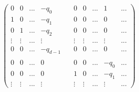 \documentclass[a4paper,11pt]{article}
\begin{document}
\[ 
\left( \begin{array}{cccccccccc}
0 & 0 & ... & -q_0 &             \ & 0 & 0 & ... & 1 & ... \\
1 & 0 & ... & -q_1 &             \ & 0 & 0 & ... & 0 & ...\\
0 & 1 & ... & -q_2 &             \ & 0 & 0 & ... & 0 & ...\\
\vdots & \vdots & ... & \vdots & \ & \vdots & \vdots & ... & \vdots & ...\\
0 & 0 & ... & -q_{d-1} &         \ & 0 & 0 & ... & 0 & ... \\ 
\\
0 & 0 & ... & 0   &              \ & 0 & 0 & ... & -q_{0} & ... \\
0 & 0 & ... & 0   &              \ & 1 & 0 & ... & -q_{1} & ... \\
\vdots & \vdots & ... & \vdots & \ & \vdots & \vdots & ... & \vdots & ...
\end{array}
\right)
\]
\end{document}
